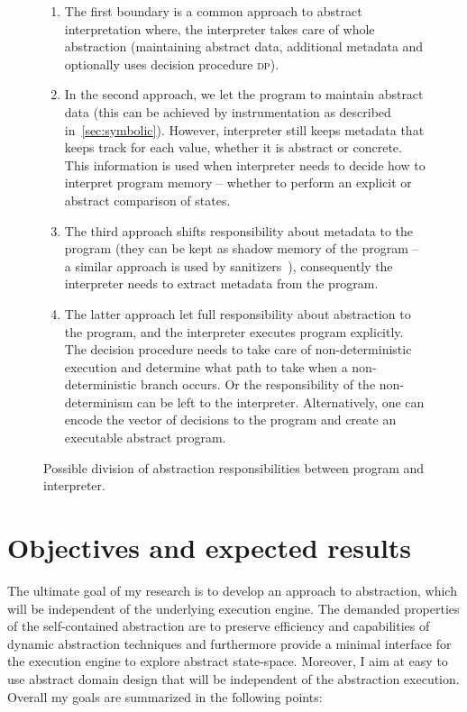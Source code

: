\begin{figure}[h]
{
}

\bigskip
\prule

\begin{enumerate}
    \item The first boundary is a common approach to abstract
        interpretation where, the interpreter takes care of whole abstraction
        (maintaining abstract data, additional metadata and optionally uses
        decision procedure \textsc{dp}).
    \item In the second approach, we let the program to maintain abstract
        data (this can be achieved by instrumentation as described
        in~\autoref{sec:symbolic}).  However, interpreter still keeps metadata
        that keeps track for each value, whether it is abstract or concrete.
        This information is used when interpreter needs to decide how to
        interpret program memory -- whether to perform an explicit or abstract
        comparison of states.
    \item The third approach shifts responsibility about metadata to
        the program (they can be kept as shadow memory of the program -- a
        similar approach is used by sanitizers~\cite{Stepanov2015}), consequently the
        interpreter needs to extract metadata from the program.
    \item The latter approach let full responsibility about abstraction to the
        program, and the interpreter executes program explicitly. The decision
        procedure needs to take care of non-deterministic execution and
        determine what path to take when a non-deterministic branch occurs. Or
        the responsibility of the non-determinism can be left to the
        interpreter. Alternatively, one can encode the vector of decisions to
        the program and create an executable abstract program.
\end{enumerate}

\caption{Possible division of abstraction responsibilities between program and interpreter.}
\label{fig:bounds}

\end{figure}

\section{Objectives and expected results}
\label{sec:objectives}

The ultimate goal of my research is to develop an approach to abstraction,
which will be independent of the underlying execution engine. The demanded
properties of the self-contained abstraction are to preserve efficiency and
capabilities of dynamic abstraction techniques and furthermore provide a
minimal interface for the execution engine to explore abstract state-space.
Moreover, I aim at easy to use abstract domain design that will be independent
of the abstraction execution. Overall my goals are summarized in the following
points:

